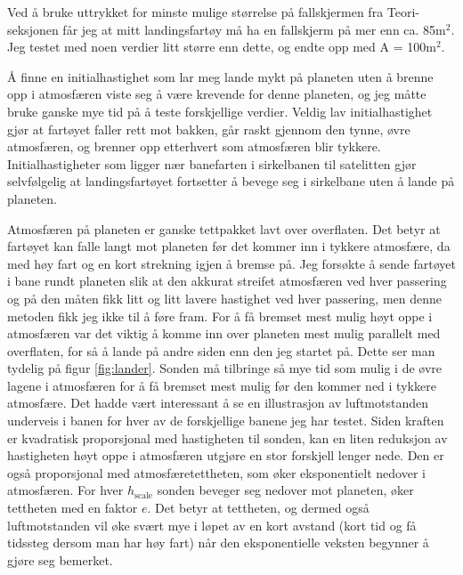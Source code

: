 \documentclass[reprint,english,notitlepage]{revtex4-1}  %
\begin{document}
Ved å bruke uttrykket for minste mulige størrelse på fallskjermen fra Teori-seksjonen får jeg at mitt landingsfartøy må ha en fallskjerm på mer enn ca. 85m$^2$. Jeg testet med noen verdier litt større enn dette, og endte opp med A = 100m$^2$.

Å finne en initialhastighet som lar meg lande mykt på planeten uten å brenne opp i atmosfæren viste seg å være krevende for denne planeten, og jeg måtte bruke ganske mye tid på å teste forskjellige verdier. Veldig lav initialhastighet gjør at fartøyet faller rett mot bakken, går raskt gjennom den tynne, øvre atmosfæren, og brenner opp etterhvert som atmosfæren blir tykkere. Initialhastigheter som ligger nær banefarten i sirkelbanen til satelitten gjør selvfølgelig at landingsfartøyet fortsetter å bevege seg i sirkelbane uten å lande på planeten.

Atmosfæren på planeten er ganske tettpakket lavt over overflaten. Det betyr at fartøyet kan falle langt mot planeten før det kommer inn i tykkere atmosfære, da med høy fart og en kort strekning igjen å bremse på. Jeg forsøkte å sende fartøyet i bane rundt planeten slik at den akkurat streifet atmosfæren ved hver passering og på den måten fikk litt og litt lavere hastighet ved hver passering, men denne metoden fikk jeg ikke til å føre fram. For å få bremset mest mulig høyt oppe i atmosfæren var det viktig å komme inn over planeten mest mulig parallelt med overflaten, for så å lande på andre siden enn den jeg startet på. Dette ser man tydelig på figur \ref{fig:lander}. Sonden må tilbringe så mye tid som mulig i de øvre lagene i atmosfæren for å få bremset mest mulig før den kommer ned i tykkere atmosfære. Det hadde vært interessant å se en illustrasjon av luftmotstanden underveis i banen for hver av de forskjellige banene jeg har testet. Siden kraften er kvadratisk proporsjonal med hastigheten til sonden, kan en liten reduksjon av hastigheten høyt oppe i atmosfæren utgjøre en stor forskjell lenger nede. Den er også proporsjonal med atmosfæretettheten, som øker eksponentielt nedover i atmosfæren. For hver $h_{\text{scale}}$ sonden beveger seg nedover mot planeten, øker tettheten med en faktor $e$. Det betyr at tettheten, og dermed også luftmotstanden vil øke svært mye i løpet av en kort avstand (kort tid og få tidssteg dersom man har høy fart) når den eksponentielle veksten begynner å gjøre seg bemerket.
\end{document}
